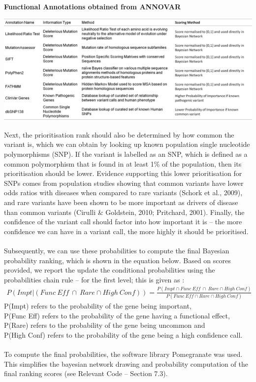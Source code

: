 \documentclass{article}
\begin{document}
\begin{table}[H]
\caption{\textbf{Functional Annotations obtained from ANNOVAR}}
\includegraphics[width=\textwidth]{annovarfeatures.png}
\centering
\end{table}
Next, the prioritisation rank should also be determined by how common the variant is, which we can obtain by looking up known population single nucleotide polymorphisms (SNP). If the variant is labelled as an SNP, which is defined as a common polymorphism that is found in at least 1\% of the population, then its prioritisation should be lower. Evidence supporting this lower prioritisation for SNPs comes from population studies showing that common variants have lower odds ratios with diseases when compared to rare variants (Schork et al., 2009), and rare variants have been shown to be more important as drivers of disease than common variants (Cirulli \& Goldstein, 2010; Pritchard, 2001). Finally, the confidence of the variant call should factor into how important it is -- the more confidence we can have in a variant call, the more highly it should be prioritised. \\\\ Subsequently, we can use these probabilities to compute the final Bayesian probability ranking, which is shown in the equation below. Based on scores provided, we report the update the conditional probabilities using the probabilities chain rule -- for the first level; this is given as :\\
\begin{equation}
\begin{split}
P(Impt | (Func \ Eff  \ \cap \ Rare  \cap High\ Conf)) =  \frac{P(Impt \cap Func \ Eff  \ \cap \ Rare \cap High \ Conf )}{P(Func \ Eff  \cap Rare  \cap High \ Conf )}
\end{split}
\end{equation}
\tiny
\indent
P(Impt) refers to the probability of the gene being important,\\
\indent P(Func Eff) refers to the probability of the gene having a functional effect,\\ 
\indent P(Rare) refers to the probability of the gene being uncommon and\\  \indent P(High Conf) refers to the probability of the gene being a high confidence call.\\\\
\normalsize
\noindent
To compute the final probabilities, the software library Pomegranate was used. This simplifies the bayesian network drawing and probability computation of the final ranking scores (see Relevant Code -- Section 7.3).
\end{document}

